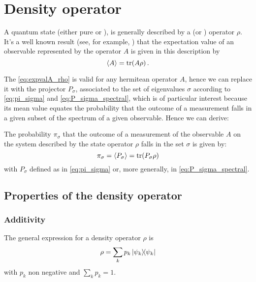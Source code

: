 \section{Density operator}\label{app:density}

A quantum state (either pure or ),
is generally described by a  (or ) operator $\rho$.
It's a well known result (see, for example, \cite{open_systems})
that the expectation value of an observable represented by the operator $A$
is given in this description by
\begin{equation}\label{eq:expvalA_rho}
  \expval{A} = \tr(A\rho)\,.
\end{equation}

The \eqref{eq:expvalA_rho} is valid for any hermitean operator $A$,
hence we can replace it with the projector $P_{\sigma}$,
associated to the set of eigenvalues $\sigma$
according to \eqref{eq:pi_sigma} and \eqref{eq:P_sigma_spectral},
which is of particular interest
because its mean value equates the probability that the outcome of a measurement
falls in a given subset of the spectrum of a given observable.
Hence we can derive:

\begin{proposition}\label{probability_rho}
  The probability $\pi_{\sigma}$
  that the outcome of a measurement of the observable $A$
  on the system described by the state operator $\rho$
  falls in the set $\sigma$
  is given by:
  \begin{equation}\label{eq:probability_rho}
    \pi_{\sigma} = \expval{P_{\sigma}} = \tr(P_{\sigma}\rho)
  \end{equation}
  with $P_{\sigma}$ defined as in \eqref{eq:pi_sigma}
  or, more generally, in \eqref{eq:P_sigma_spectral}.
\end{proposition}

\subsection{Properties of the density operator}
\subsubsection{Additivity}
The general expression for a density operator $\rho$ is
$$
  \rho = \sum_{k}p_{k}\ketbra{\psi_{k}}
$$
with $p_{k}$ non negative and $\sum_{k}p_{k} = 1$.

